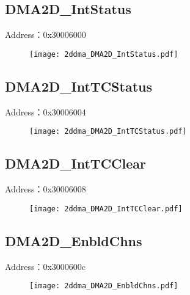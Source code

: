 \subsection{DMA2D\_IntStatus}
\label{2ddma-DMA2D-IntStatus}
Address：0x30006000
 \begin{figure}[H]
\texttt{[image: 2ddma\_DMA2D\_IntStatus.pdf]}
\end{figure}

\subsection{DMA2D\_IntTCStatus}
\label{2ddma-DMA2D-IntTCStatus}
Address：0x30006004
 \begin{figure}[H]
\texttt{[image: 2ddma\_DMA2D\_IntTCStatus.pdf]}
\end{figure}

\subsection{DMA2D\_IntTCClear}
\label{2ddma-DMA2D-IntTCClear}
Address：0x30006008
 \begin{figure}[H]
\texttt{[image: 2ddma\_DMA2D\_IntTCClear.pdf]}
\end{figure}

\subsection{DMA2D\_EnbldChns}
\label{2ddma-DMA2D-EnbldChns}
Address：0x3000600c
 \begin{figure}[H]
\texttt{[image: 2ddma\_DMA2D\_EnbldChns.pdf]}
\end{figure}

